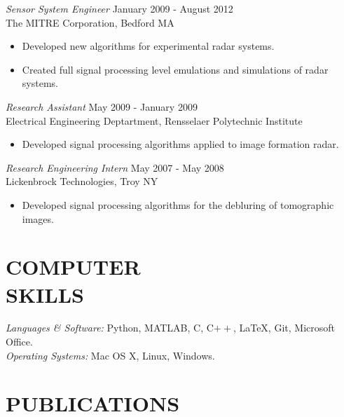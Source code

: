  {\sl Sensor System Engineer} \hfill January 2009 - August 2012\\
                The MITRE Corporation, Bedford MA 
                 	\begin{itemize}  \itemsep -2pt %
                	\item Developed new algorithms for experimental radar systems.
                	\item Created full signal processing level emulations and simulations of radar systems.
                \end{itemize}
 
                {\sl Research Assistant} \hfill            May 2009 - January 2009 \\
                Electrical Engineering Deptartment, Rensselaer Polytechnic Institute 
                 \begin{itemize}  \itemsep -2pt %
                 \item Developed signal processing algorithms applied to image formation radar.
                 \end{itemize} 
                {\sl Research Engineering Intern} \hfill        May 2007 - May 2008\\
                Lickenbrock Technologies, Troy NY
                  \begin{itemize}
                   \item Developed signal processing algorithms for the debluring of tomographic images.
                   \end{itemize} 
\section*{COMPUTER \\ SKILLS} {\sl Languages \& Software:} Python, MATLAB, C, C$++$, \LaTeX, Git, Microsoft Office.\\
                {\sl Operating Systems:} Mac OS X, Linux, Windows. 
 
\section*{PUBLICATIONS}   

